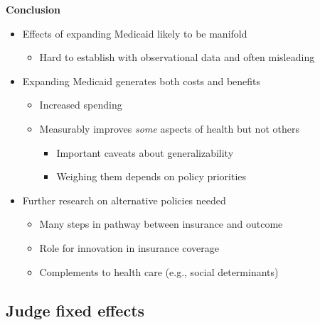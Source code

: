 \documentclass[notes=show]{beamer}
\begin{document}
\begin{frame}[plain]
	\begin{center}
	\textbf{Conclusion}
	\end{center}
	
	\begin{itemize}
	\item Effects of expanding Medicaid likely to be manifold
		\begin{itemize}
		\item Hard to establish with observational data and often misleading 
		\end{itemize}
	\item Expanding Medicaid generates both costs and benefits
		\begin{itemize}
		\item Increased spending
		\item Measurably improves \emph{some} aspects of health but not others
			\begin{itemize}
			\item Important caveats about generalizability
			\item Weighing them depends on policy priorities
			\end{itemize}
		\end{itemize}
	\item Further research on alternative policies needed
		\begin{itemize}
		\item Many steps in pathway between insurance and outcome
		\item Role for innovation in insurance coverage
		\item Complements to health care (e.g., social determinants)
		\end{itemize}
	\end{itemize}
\end{frame}




\subsection{Judge fixed effects}
\end{document}
